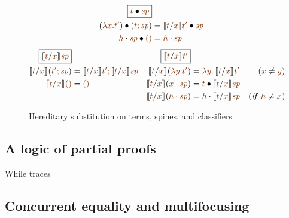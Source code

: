 \begin{figure}[t]
\begin{align*}
\fbox{$\subst{\lf{t}}{\lf{\spi}}$}
\\
\subst{(\lf{\lambda x. t'})}{(\lf{t; \spi})}
 & = \subst{\rsubst{\lf{t}}{\lf{x}}{\lf{t'}}}{\lf{\spi}}
\\
\subst{\lfroot{\lf h}{\spi}}{\lfnil}
 & = \lfroot{\lf h}{\spi}
\end{align*}\begin{align*}
\fbox{$\rsubst{\lf{t}}{\lf{x}}{\lf{\spi}}$}&
&
\fbox{$\rsubst{\lf{t}}{\lf{x}}{\lf{t'}}$}&
&
\\
\rsubst{\lf t}{\lf x}{(\lf{t'; \spi})}
 & = \lf{\no{\rsubst{\lf t}{\lf x}{\lf{t'}}}; 
         \no{\rsubst{\lf t}{\lf x}{\lf{\spi}}}} &
\rsubst{\lf t}{\lf x}(\lf{\lambda y. t'})
 & = \lf{\lambda y.\, \no{\rsubst{\lf t}{\lf x}{\lf{t'}}}} 
      & (\lf x \neq \lf y) 
\\
\rsubst{\lf t}{\lf x}{\lfnil} 
 & = \lfnil &
\rsubst{\lf t}{\lf x}{(\lf{\lfroot{x}{\spi}})}
 & = \subst{\lf t}{\rsubst{\lf t}{\lf x}{\lf{\spi}}}
\\
& & 
\rsubst{\lf t}{\lf x}{(\lf{\lfroot{h}{\spi}})}
 & = \lfroot{\lf h}{\no{\rsubst{\lf t}{\lf x}{\lf{\spi}}}}
      & ({\it if}~ \lf{h} \neq \lf{x})
\end{align*}
\caption{Hereditary substitution on terms, spines, and classifiers}
\label{fig:lf-hsubst}
\end{figure}

\subsection{A logic of partial proofs}

While traces 

\subsection{Concurrent equality and multifocusing}

